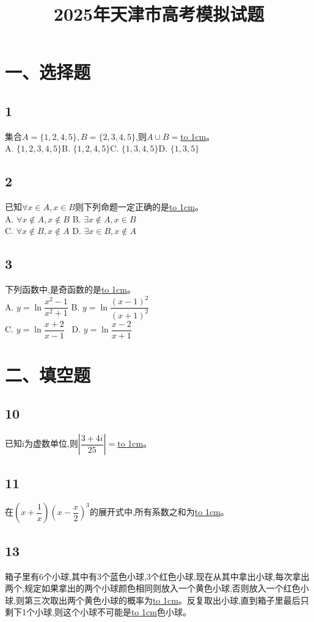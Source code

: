 \documentclass[fontset=windows]{article}
\title{\heiti\zihao{2} 2025年天津市高考模拟试题 }
\author{\songti }
\date{}
\begin{document}
	\maketitle
	\thispagestyle{empty}

\section{一、选择题}
\subsection{1}
集合$A=\{1,2,4,5\},B=\{2,3,4,5\}$,则$A\cup B=$\underline{\hbox to 1cm{}}。\\
A. $\{1,2,3,4,5\}$\quad B. $\{1,2,4,5\}$\quad C. $\{1,3,4,5\}$\quad D. $\{1,3,5\}$
\subsection{2}
已知$\forall x \in A, x \in B$则下列命题一定正确的是\underline{\hbox to 1cm{}}。\\
A. $\forall x \notin A, x \notin B$\qquad \qquad
B. $\exists x \notin A, x \in B$\\
C. $\forall x \notin B, x \notin A$\qquad \qquad
D. $\exists x \in B, x \notin A$
\subsection{3}
下列函数中,是奇函数的是\underline{\hbox to 1cm{}}。\\
A. $y=\ln\dfrac{x^2-1}{x^2+1}$\qquad \qquad
B. $y=\ln\dfrac{(x-1)^2}{(x+1)^2}$\\
C. $y=\ln\dfrac{x+2}{x-1}$\qquad \qquad ~
D. $y=\ln\dfrac{x-2}{x+1}$


\section{二、填空题}
\subsection{10}
已知$\mathrm{i}$为虚数单位,则$\left| \dfrac{3+4i}{25} \right|= $\underline{\hbox to 1cm{}}。
\subsection{11}
在$(x+\dfrac{1}{x})(x-\dfrac{x}{2})^3$的展开式中,所有系数之和为\underline{\hbox to 1cm{}}。
\subsection{13}
箱子里有6个小球,其中有3个蓝色小球,3个红色小球,现在从其中拿出小球,每次拿出两个,规定如果拿出的两个小球颜色相同则放入一个黄色小球,否则放入一个红色小球,则第三次取出两个黄色小球的概率为\underline{\hbox to 1cm{}}。反复取出小球,直到箱子里最后只剩下1个小球,则这个小球不可能是\underline{\hbox to 1cm{}}色小球。
\end{document}
